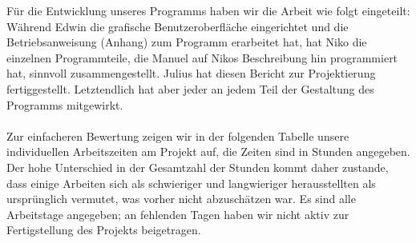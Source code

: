 \documentclass[a4paper, 11pt, titlepage]{article}
\begin{document}
Für die Entwicklung unseres Programms haben wir die Arbeit wie folgt eingeteilt: Während Edwin die grafische Benutzeroberfläche eingerichtet und die Betriebsanweisung (Anhang) zum Programm erarbeitet hat, hat Niko die einzelnen Programmteile, die Manuel auf Nikos Beschreibung hin programmiert hat, sinnvoll zusammengestellt. Julius hat diesen Bericht zur Projektierung fertiggestellt. Letztendlich hat aber jeder an jedem Teil der Gestaltung des Programms mitgewirkt.\\\\
Zur einfacheren Bewertung zeigen wir in der folgenden Tabelle unsere individuellen Arbeitszeiten am Projekt auf, die Zeiten sind in Stunden angegeben. Der hohe Unterschied in der Gesamtzahl der Stunden kommt daher zustande, dass einige Arbeiten sich als schwieriger und langwieriger herausstellten als ursprünglich vermutet, was vorher nicht abzuschätzen war. Es sind alle Arbeitstage angegeben; an fehlenden Tagen haben wir nicht aktiv zur Fertigstellung des Projekts beigetragen.
\end{document}
